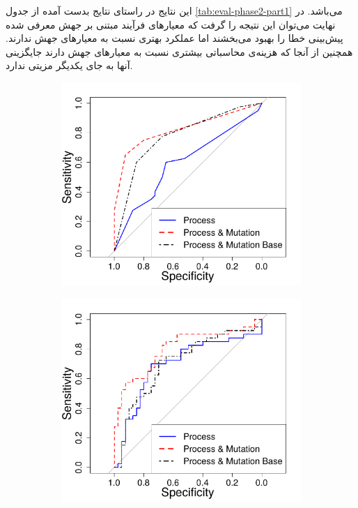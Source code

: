 این نتایج در راستای نتایج بدست آمده از جدول \ref{tab:eval-phase2-part1} می‌باشد. در نهایت می‌توان این نتیجه را گرفت که معیارهای فرآیند مبتنی بر جهش معرفی شده پیش‌بینی خطا را بهبود می‌بخشند  اما عملکرد بهتری نسبت به معیارهای جهش ندارند. همچنین از آنجا که هزینه‌ی محاسباتی بیشتری نسبت به معیارهای جهش دارند جایگزینی آنها به جای یکدیگر مزیتی ندارد. 

\begin{figure}[H]
	\begin{subfigure}{.5\textwidth}
		\centering
		\includegraphics[width=\linewidth]{img/evaluation/phase2-part1-roc-dt.pdf}
		\caption{}
	\end{subfigure}
	\begin{subfigure}{.5\textwidth}
		\centering
		\includegraphics[width=\linewidth]{img/evaluation/phase2-part1-roc-svm.pdf}

\end{subfigure}
\end{figure}
